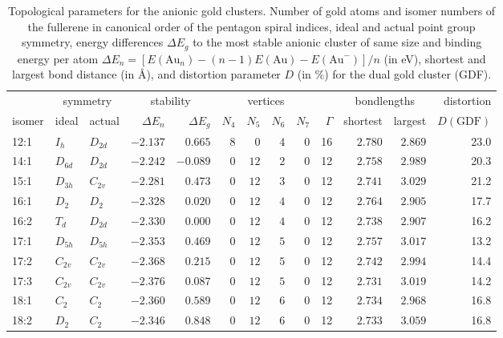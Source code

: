 \begin{table}[ht!]
	\centering
	\caption{Topological parameters for the anionic gold clusters. Number of gold atoms and isomer numbers of the fullerene in canonical order of the pentagon spiral indices,\autocite{Fowler-atlas-2006} ideal and actual point group symmetry, energy differences $\Delta E_g$ to the most stable anionic cluster of same size and binding energy per atom $\Delta E_n = [E(\textrm{Au}_n)-(n-1)E(\textrm{Au})-E(\textrm{Au}^-)]/n$  (in eV), shortest and largest bond distance (in \AA), and distortion parameter $D$ (in \%) for the dual gold cluster (GDF). }
\begin{tabular}{lllrrrrrrrrrr}
\toprule
\multicolumn{1}{c}{  } & \multicolumn{2}{c}{ symmetry  }  & \multicolumn{2}{c}{stability} & \multicolumn{4}{c}{ vertices } & & \multicolumn{2}{c}{ bondlengths } &  distortion \\
isomer & ideal  & actual  & $\Delta E_n$ &$\Delta E_g$ & \multicolumn{1}{c}{$N_4$} & \multicolumn{1}{c}{$N_5$} & \multicolumn{1}{c}{$N_6$} & \multicolumn{1}{c}{$N_7$}& $\Gamma$ & shortest & largest   & $D(\textrm{GDF})$  \\\midrule
12:1    & $I_h$    & $D_{2d}$  & $-2.137$ & $0.665$  & $8$ & $0$  & $4$  & $0$ & 16 & $2.780$ & $2.869$  &  23.0 \\
14:1    & $D_{6d}$ & $D_{2d}$  & $-2.242$ & $-0.089$ & $0$ & $12$ & $2$  & $0$ & 12 & $2.758$ & $2.989$  &  20.3 \\
15:1    & $D_{3h}$ & $C_{2v}$  & $-2.281$ & $0.473$  & $0$ & $12$ & $3$  & $0$ & 12 & $2.741$ & $3.029$  &  21.2 \\
16:1    & $D_2$    & $D_{2 }$  & $-2.328$ & $0.020$  & $0$ & $12$ & $4$  & $0$ & 12 & $2.764$ & $2.905$  &  17.7 \\
16:2    & $T_d$    & $D_{2d}$  & $-2.330$ & $0.000$  & $0$ & $12$ & $4$  & $0$ & 12 & $2.738$ & $2.907$  &  16.2 \\
17:1    & $D_{5h}$ & $D_{5h}$  & $-2.353$ & $0.469$  & $0$ & $12$ & $5$  & $0$ & 12 & $2.757$ & $3.017$  &  13.2 \\
17:2    & $C_{2v}$ & $C_{2v}$  & $-2.368$ & $0.215$  & $0$ & $12$ & $5$  & $0$ & 12 & $2.742$ & $2.994$  &  14.4 \\
17:3    & $C_{2v}$ & $C_{2v}$  & $-2.376$ & $0.087$  & $0$ & $12$ & $5$  & $0$ & 12 & $2.731$ & $3.019$  &  14.2 \\
18:1    & $C_2$    & $C_{2 }$  & $-2.360$ & $0.589$  & $0$ & $12$ & $6$  & $0$ & 12 & $2.734$ & $2.968$  &  16.8 \\
18:2    & $D_2$    & $C_{2 }$  & $-2.346$ & $0.848$  & $0$ & $12$ & $6$  & $0$ & 12 & $2.733$ & $3.059$  &  16.8 \\

\end{tabular}
\end{table}
